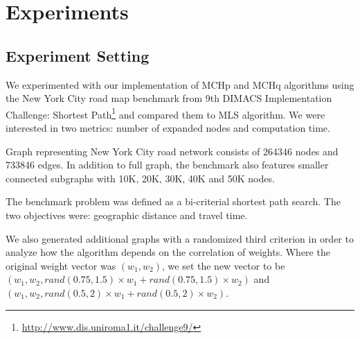 


\section{Experiments}
\label{secExperiments}

\subsection{Experiment Setting}
We experimented with our implementation of MCHp and MCHq algorithms using the New York City road map benchmark from 9th DIMACS Implementation Challenge: Shortest Path\footnote{
\url{http://www.dis.uniroma1.it/challenge9/}} and compared them to MLS algorithm. We were interested in two metrics: number of expanded nodes and computation time.

Graph representing New York City road network consists of 264346 nodes and 733846 edges. In addition to full graph, the benchmark also features smaller connected subgraphs with 10K, 20K, 30K, 40K and 50K nodes. 

The benchmark problem was defined as a bi-criterial shortest path search. The two objectives were: geographic distance and travel time. 

We also generated additional graphs with a randomized third criterion in order to analyze how the algorithm depends on the correlation of weights. Where the original weight vector was $(w_1,w_2)$, we set the new vector to be $(w_1,w_2,rand(0.75,1.5) \times w_1 + rand(0.75,1.5) \times w_2)$ and $(w_1,w_2,rand(0.5,2) \times w_1 + rand(0.5,2) \times w_2)$. 

